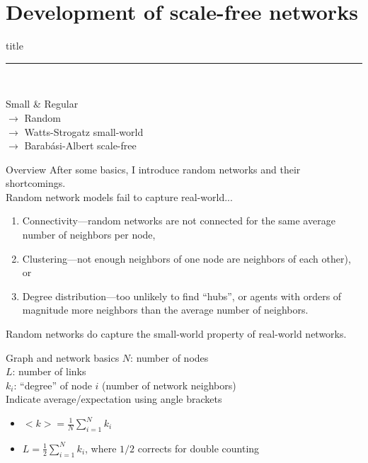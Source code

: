 \documentclass[notes]{beamer}
\begin{document}
\section{Development of scale-free networks}
\begin{frame}[plain]
  \vfill
  \centering
  \begin{beamercolorbox}[sep=8pt,center,shadow=true,rounded=true]{title}
    \insertsectionhead\par%
    \color{oxfordblue}\noindent\rule{10cm}{1pt} \\[1em]

    \centering
    \begin{flushleft}
      Small \& Regular \\
        $\rightarrow$ Random \\
        $\rightarrow$ Watts-Strogatz small-world \\
        $\rightarrow$ Barabási-Albert scale-free
    \end{flushleft}
  \end{beamercolorbox}
\end{frame}

\begin{frame}{Overview}
  After some basics, I introduce random networks and their shortcomings. \\[.2em]

  Random network models fail to capture real-world...
  \begin{enumerate}
    \item Connectivity---random networks are not connected for the same average
      number of neighbors per node,
    \item Clustering---not enough neighbors of one node are neighbors of each other), or
    \item Degree distribution---too unlikely to find ``hubs'', or agents with orders
      of magnitude more neighbors than the average number of neighbors.
  \end{enumerate} 
  \vspace{.2em}
  
  Random networks do capture the small-world property of real-world networks.
\end{frame}

\begin{frame}{Graph and network basics}
  $N$: number of nodes \\
  $L$: number of links \\
  $k_i$: ``degree'' of node $i$ (number of network neighbors) \\[1em]

  Indicate average/expectation using angle brackets
  \begin{center}
    \begin{itemize}
      \item $<k> = \frac{1}{N} \sum_{i=1}^N k_i$
      \item $L = \frac{1}{2} \sum_{i=1}^N k_i$, where $1/2$ corrects for double counting 
    \end{itemize}

  \end{center}
\end{frame}
\end{document}
